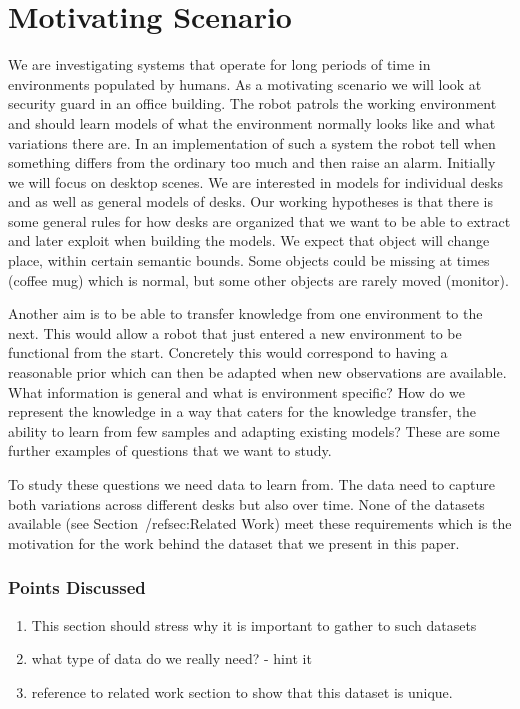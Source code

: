\documentclass[letterpaper, 10 pt, conference]{ieeeconf}  %
\begin{document}
\section{Motivating Scenario}
\label{sec:Motivating Scenario}

We are investigating systems that operate for long periods of time in environments populated by humans. 
As a motivating scenario we will look at security guard in an office building. The robot patrols the working environment and should learn 
models of what the environment normally looks like and what variations there are. In an implementation of such a system the robot tell when 
something differs from the ordinary too much and then raise an alarm. Initially we will focus on desktop scenes. We are interested in models 
for individual desks and as well as general models of desks. Our working hypotheses is that there is some general rules for how desks are 
organized that we want to be able to extract and later exploit when building the models. We expect that object will change place, within certain semantic bounds. Some objects could be missing at times (coffee mug) which is normal, but some other objects are rarely moved (monitor).

Another aim is to be able to transfer knowledge from one environment to the next. This would allow a robot that just entered a new 
environment to be functional from the start. Concretely this would correspond to having a reasonable prior which can then be adapted when 
new observations are available. What information is general and what is environment specific? How do we represent the knowledge in a way that caters for the knowledge transfer, the ability to learn from few samples and adapting existing models? These are some further examples of questions that we want to study.

To study these questions we need data to learn from. The data need to capture both variations across different desks but also over time. None of the datasets available (see Section~/ref{sec:Related Work}) meet these requirements which is the motivation for the work behind the dataset that we present in this paper.

\subsubsection*{Points Discussed}
\begin{enumerate}
	\item This section should stress why it is important to gather to such datasets
	\item what type of data do we really need? - hint it
	\item reference to related work section to show that this dataset is unique.
\end{enumerate}
\end{document}
